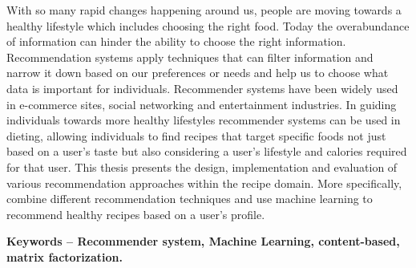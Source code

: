 



\vspace{1mm}

\normalsize
\noindent With so many rapid changes happening around us, people are moving towards a healthy lifestyle which includes choosing the right food. Today the overabundance of information can hinder the ability to choose the right information. Recommendation systems apply techniques that can filter information and narrow it down based on our preferences or needs and help us to choose what data is important for individuals. Recommender systems have been widely used in e-commerce sites, social networking and entertainment industries. In guiding individuals towards more healthy lifestyles recommender systems can be used in dieting, allowing individuals to find recipes that target specific foods not just based on a user's taste but also considering a user's lifestyle and calories required for that user. This thesis presents the design, implementation and evaluation of various recommendation approaches within the recipe domain. More specifically, combine different recommendation techniques and use machine learning to recommend healthy recipes based on a user's profile.

\vspace*{\fill}
\noindent \textbf{Keywords – Recommender system, Machine Learning, content-based, matrix factorization.}




